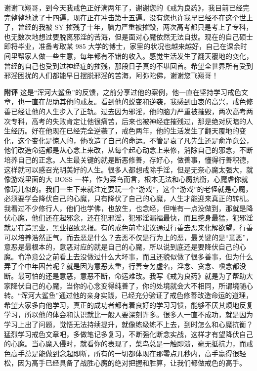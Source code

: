 \begin{case}
    谢谢飞翔哥，到今天我戒色正好满两年了，谢谢您的《戒为良药》，我目前已经完完整整地读了十四遍，现在正在冲击第十五遍。没有您也许我早已经不在这个世上了，曾经的我被 SY 摧残了十年，脑力严重被摧毁，两次高考都只是考上了专科，也无数次地想过要脱离邪淫的苦海，但是面对心魔依然无法自拔。现在的自己硕士即将毕业，准备考取某 985 大学的博士，家里的状况也越来越好，自己在课余时间里帮家人做一些生意，每年都有不错的收入。感觉生活发生了翻天覆地的变化，曾经的自己也受到过神经症的摧残，那段日子真的不堪回首。希望全世界所有受到邪淫困扰的人们都能早日摆脱邪淫的苦海，阿弥陀佛，谢谢您飞翔哥！

    \textbf{附评} 这是“浑河大鲨鱼”的反馈，之前分享过他的案例，他一直在坚持学习戒色文章，也一直在帮助其他的戒友。看到他的蜕变和逆袭，我感到由衷的高兴，戒色修善已经让他的人生步入了正轨。过去因为邪淫，他的脑力严重被摧毁，两次高考两次专科，高考的失败肯定让他很痛苦，后来也被神经症摧残过，那是绝对灰暗的人生经历。好在他现在已经完全逆袭了，戒色两年，他的生活发生了翻天覆地的变化，这个变化是惊人的，他改造了自己的命运。不管是袁了凡先生还是俞净意公，他们改造命运都是从心念上来改，从每个起心动念上来修，消除自己的邪念，不断培养自己的正念。人生最关键的就是断恶修善，存好心，做善事，懂得行善积德，这样就可以感召光明美好的人生。很多人都想戒除手淫，但是无奈心魔太强大，就像游戏里面的大 BOSS 一样，作为菜鸟而言，根本无法和心魔抗衡，心魔虐你就像玩儿似的。我们一生下来就注定要玩一个“游戏”，这个“游戏”的老怪就是心魔，必须要学会降伏自己的心魔，只有降伏了自己的心魔，人生才能迎来真正的转机。我看过不少修行人，他们也学佛，也放生，也念经，但唯有一点没做到，那就是降伏心魔，他们还在起邪念，还在犯邪淫，犯邪淫漏福最快，而且挖身最猛，犯邪淫就是在造黑业，黑业招致恶报。有的戒色前辈建议通过行善去恶来化解欲望，行善可以培养浩然正气，而去恶是什么？去恶不仅是行为上的恶，最关键的是“意恶”，意恶是最根本的，意恶对应的就是自己的心魔，所以说到底还是要降伏自己的心魔。俞净意公之前看上去没做过什么大坏事，而且还貌似做了很多善事，但为什么弄了个中年困苦呢？就是因为意恶太重，行善专务虚名，淫念、贪念、嗔念都没断。最可怕的还是意恶，意恶不断，命运难改。我写《戒为良药》就是为了帮助大家降伏自己的心魔，当你的心念变得纯善了，你的处境就会大不相同，所谓境随心转。“浑河大鲨鱼”通过他的亲身实践，已经充分验证了戒色修善改造命运的道理，希望大家多向他学习，真正的成功者都有着良好的学习习惯，能够不厌其烦地反复学习，所以他的体会和认识就比一般人要深刻许多。很多人一直不成功，就是因为学习上出了问题，觉悟无法持续提升，就像练级练不上去，到时怎么和心魔抗衡？猛烈学习戒色文章吧，多做笔记多复习，不断强化断念实战，这样才有望降伏自己的心魔。当心魔入侵时，就看你的表现了，菜鸟总是一触即溃，毫无抵抗力，而戒色高手总是能做到念起即断，所有的一切都体现在那零点几秒内，高手赢得很轻松，因为高手已经具备了战胜心魔的绝对把握和胜算，让我们都做戒色的高手。
\end{case}

